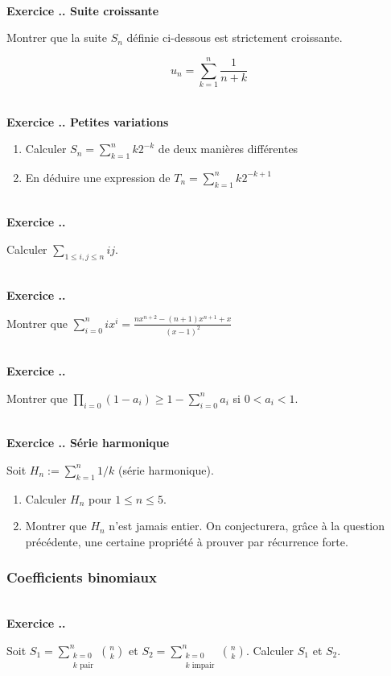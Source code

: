 \documentclass{article}
\newcounter{exo}
\newcommand{\exercice}[1][\null]{\textbf{\\ Exercice \thesection.\theexo. #1} \addtocounter{exo}{1}}
\begin{document}
\exercice[Suite croissante]

Montrer que la suite $S_n$ définie ci-dessous est strictement croissante.

\begin{equation*}
    u_n = \sum_{k = 1}^n \frac{1}{n + k}
\end{equation*}

\exercice[Petites variations]

\begin{enumerate}
    \item Calculer $S_n = \sum_{k =1}^{n} k 2^{-k}$ de deux manières 
        différentes
    \item En déduire une expression de  $T_n = \sum_{k=1}^{n} k 2^{-k+1}$
\end{enumerate}


\exercice  Calculer $\displaystyle \sum_{1 \le i, j \le n} ij$.

\exercice

Montrer que $\displaystyle \sum_{i=0}^n i x^i = \frac{n x^{n+2} - (n+1)x^{n+1} +x}{(x-1)^2}$

\exercice

Montrer que $\displaystyle \prod_{i=0}(1-a_i) \ge 1- \sum_{i=0}^n a_i$ si $0<a_i<1$.

\exercice[Série harmonique]

Soit $ H_n := \sum_{k =1}^n 1/k$ (série harmonique).

\begin{enumerate}

\item Calculer $H_n$ pour $1\le n \le 5$.

\item Montrer que $H_n$ n'est jamais entier. On conjecturera, grâce à la question précédente, une certaine propriété à prouver par récurrence forte.

\end{enumerate}



\subsubsection{Coefficients binomiaux}

\exercice

Soit $\displaystyle S_1 = \sum_{\substack{k=0 \\ k \text{ pair}}}^n {n \choose k}$ et $\displaystyle S_2 = \sum_{\substack{k=0 \\ k \text{ impair}}}^n {n \choose k}$. Calculer $S_1$ et $S_2$.
\end{document}
